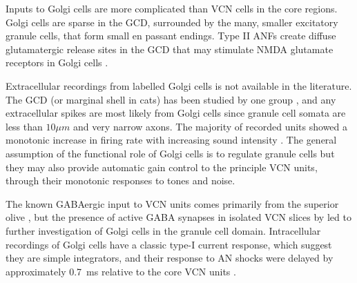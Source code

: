 


Inputs to Golgi cells are more complicated than VCN cells in the core
regions. Golgi cells are sparse in the GCD, surrounded by the many, smaller
excitatory granule cells, that form small en passant endings. Type II ANFs
create diffuse glutamatergic release sites in the GCD
\citep{HurdHutsonEtAl:1999,BensonBrown:2004} that may stimulate NMDA glutamate
receptors in Golgi cells \citep{FerragamoGoldingEtAl:1998a}.


Extracellular recordings from labelled Golgi cells is not available in the
literature.  The GCD (or marginal shell in cats) has been studied by one group
\citet{GhoshalKim:1997}, and any extracellular spikes are most likely from Golgi
cells since granule cell somata are less than $10{}\mu{m}$ and very narrow
axons. The majority of recorded units showed a monotonic increase in firing rate
with increasing sound intensity
\citep[Figure~\ref{fig:GolgiKimFig2}][]{GhoshalKim:1997}.  The general
assumption of the functional role of Golgi cells is to regulate granule cells
but they may also provide automatic gain control to the principle VCN units,
through their monotonic responses to tones and noise.


The known GABAergic input to VCN units comes primarily from the superior olive
\citep{}, but the presence of active GABA synapses in isolated VCN slices by
\citet{FerragamoGoldingEtAl:1998} led to further investigation of Golgi cells in
the granule cell domain. Intracellular recordings of Golgi cells have a classic
type-I current response, which suggest they are simple integrators, and their
response to AN shocks were delayed by approximately 0.7~ms relative to the core
VCN units \citep{FerragamoGoldingEtAl:1998}.


